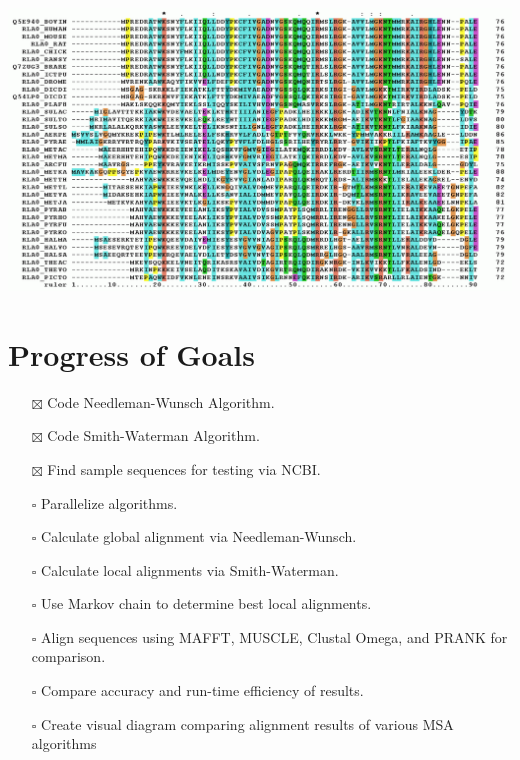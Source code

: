 \documentclass{article}
\begin{document}
\begin{center}
    \includegraphics[scale=0.4]{multiple_alignment}
\end{center}

\section*{Progress of Goals}
\begin{itemize}
    \item [$\boxtimes$] Code Needleman-Wunsch Algorithm.
    \item [$\boxtimes$] Code Smith-Waterman Algorithm.
    \item [$\boxtimes$] Find sample sequences for testing via NCBI.
    \item [$\square$] Parallelize algorithms.
    \item [$\square$] Calculate global alignment via Needleman-Wunsch.
    \item [$\square$] Calculate local alignments via Smith-Waterman.
    \item [$\square$] Use Markov chain to determine best local alignments.
    \item [$\square$] Align sequences using MAFFT, MUSCLE, Clustal Omega, and
        PRANK for comparison.
    \item [$\square$] Compare accuracy and run-time efficiency of
        results.
    \item [$\square$] Create visual diagram comparing alignment results of
        various MSA algorithms
\end{itemize}
\end{document}
